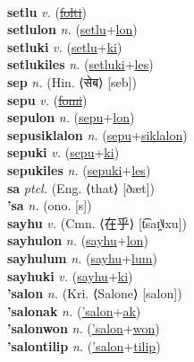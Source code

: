  \label{setak} \\
\textbf{setlu} \textit{v.} (\hyperref[folti]{\sout{folti}})
 \label{setlu} \\
\textbf{setlulon} \textit{n.} (\hyperref[setlu]{setlu}+\hyperref[lon]{lon})
 \label{setlulon} \\
\textbf{setluki} \textit{v.} (\hyperref[setlu]{setlu}+\hyperref[ki]{ki})
 \label{setluki} \\
\textbf{setlukiles} \textit{n.} (\hyperref[setluki]{setluki}+\hyperref[les]{les})
 \label{setlukiles} \\
\textbf{sep} \textit{n.} (Hin. ⟨सेब⟩ [seb])
 \label{sep} \\
\textbf{sepu} \textit{v.} (\hyperref[fomi]{\sout{fomi}})
 \label{sepu} \\
\textbf{sepulon} \textit{n.} (\hyperref[sepu]{sepu}+\hyperref[lon]{lon})
 \label{sepulon} \\
\textbf{sepusiklalon} \textit{n.} (\hyperref[sepu]{sepu}+\hyperref[siklalon]{siklalon})
 \label{sepusiklalon} \\
\textbf{sepuki} \textit{v.} (\hyperref[sepu]{sepu}+\hyperref[ki]{ki})
 \label{sepuki} \\
\textbf{sepukiles} \textit{n.} (\hyperref[sepuki]{sepuki}+\hyperref[les]{les})
 \label{sepukiles} \\
\textbf{sa} \textit{ptcl.} (Eng. ⟨that⟩ [ðæt])
 \label{sa} \\
\textbf{'sa} \textit{n.} (ono. [s])
 \label{'sa} \\
\textbf{sayhu} \textit{v.} (Cmn. ⟨在乎⟩ [t͡saɪ̯˥˩xu])
 \label{sayhu} \\
\textbf{sayhulon} \textit{n.} (\hyperref[sayhu]{sayhu}+\hyperref[lon]{lon})
 \label{sayhulon} \\
\textbf{sayhulum} \textit{n.} (\hyperref[sayhu]{sayhu}+\hyperref[lum]{lum})
 \label{sayhulum} \\
\textbf{sayhuki} \textit{v.} (\hyperref[sayhu]{sayhu}+\hyperref[ki]{ki})
 \label{sayhuki} \\
\textbf{'salon} \textit{n.} (Kri. ⟨Salone⟩ [salon])
 \label{'salon} \\
\textbf{'salonak} \textit{n.} (\hyperref['salon]{'salon}+\hyperref[ak]{ak})
 \label{'salonak} \\
\textbf{'salonwon} \textit{n.} (\hyperref['salon]{'salon}+\hyperref[won]{won})
 \label{'salonwon} \\
\textbf{'salontilip} \textit{n.} (\hyperref['salon]{'salon}+\hyperref[tilip]{tilip})
 \label{'salontilip} \\
